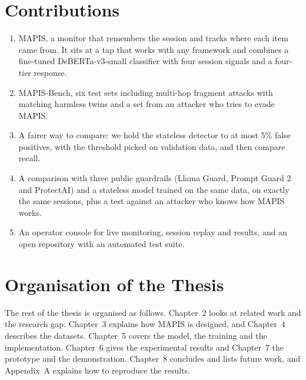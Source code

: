\section{Contributions}
\begin{enumerate}
\item MAPIS, a monitor that remembers the session and tracks where each item came from. It sits at a tap that works with any framework and combines a fine-tuned DeBERTa-v3-small classifier with four session signals and a four-tier response.
\item MAPIS-Bench, six test sets including multi-hop fragment attacks with matching harmless twins and a set from an attacker who tries to evade MAPIS.
\item A fairer way to compare: we hold the stateless detector to at most 5\% false positives, with the threshold picked on validation data, and then compare recall.
\item A comparison with three public guardrails (Llama Guard, Prompt Guard 2 and ProtectAI) and a stateless model trained on the same data, on exactly the same sessions, plus a test against an attacker who knows how MAPIS works.
\item An operator console for live monitoring, session replay and results, and an open repository with an automated test suite.
\end{enumerate}

\section{Organisation of the Thesis}
The rest of the thesis is organised as follows. Chapter~2 looks at related work and the research gap. Chapter~3 explains how MAPIS is designed, and Chapter~4 describes the datasets. Chapter~5 covers the model, the training and the implementation. Chapter~6 gives the experimental results and Chapter~7 the prototype and the demonstration. Chapter~8 concludes and lists future work, and Appendix~A explains how to reproduce the results.
